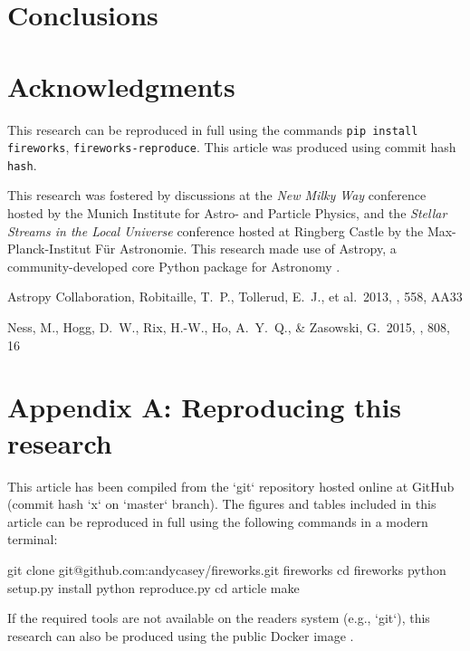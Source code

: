 \documentclass[useAMS,usenatbib]{mn2e}
\begin{document}
\section{Conclusions}

% 


\section*{Acknowledgments}
This research can be reproduced in full using the commands \texttt{pip install fireworks},
\texttt{fireworks-reproduce}. This article was produced using commit hash \texttt{hash}.

This research was fostered by discussions at the \textit{New Milky Way}
conference hosted by the Munich Institute for Astro- and Particle Physics, and
the \textit{Stellar Streams in the Local Universe} conference hosted at Ringberg
Castle by the Max-Planck-Institut F\"ur Astronomie. This research made use of 
Astropy, a community-developed core Python package for Astronomy \citep{astropy}.

\begin{thebibliography}{99}
 Astropy Collaboration, Robitaille, T.~P., Tollerud, E.~J., et al.\ 2013, \aap, 558, AA33

 Ness, M., Hogg, D.~W., 
Rix, H.-W., Ho, A.~Y.~Q., \& Zasowski, G.\ 2015, \apj, 808, 16 
\end{thebibliography}


\label{lastpage}

\section{Appendix A: Reproducing this research}
This article has been compiled from the `git` repository hosted online at GitHub (commit hash `x` on `master` branch). The figures and tables included in this article can be reproduced in full using the following commands in a modern terminal:

git clone git@github.com:andycasey/fireworks.git fireworks
cd fireworks
python setup.py install
python reproduce.py
cd article
make

If the required tools are not available on the readers system (e.g., `git`), this research can also be produced using the public Docker image .
\end{document}
